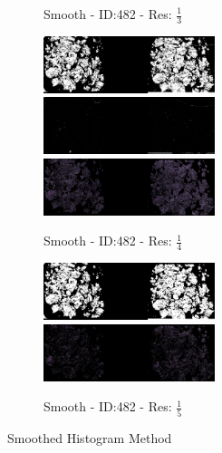 \documentclass[letterpaper,10pt,oneside]{article}
\begin{document}
\begin{figure}[hbtp]
\begin{subfigure}[b]{5cm}
    \caption{Smooth - ID:482 - Res: $\frac{1}{3}$}
  \end{subfigure}
  \begin{subfigure}[b]{5cm}
    \includegraphics[width=5cm]{visualization/results/smoothhistogram/res_reduce_4/Region_0_PO14-00482B3_1_2_201404171123.png}
    \includegraphics[width=5cm]{visualization/results/smoothhistogram/res_reduce_4/Region_1_PO14-00482B3_1_2_201404171123.png}
    \includegraphics[width=5cm]{visualization/results/smoothhistogram/res_reduce_4/Region_2_PO14-00482B3_1_2_201404171123.png}
    \caption{Smooth - ID:482 - Res: $\frac{1}{4}$}
  \end{subfigure}
  \begin{subfigure}[b]{5cm}
    \includegraphics[width=5cm]{visualization/results/smoothhistogram/res_reduce_5/Region_0_PO14-00482B3_1_2_201404171123.png}
    \includegraphics[width=5cm]{visualization/results/smoothhistogram/res_reduce_5/Region_1_PO14-00482B3_1_2_201404171123.png}
    \caption{Smooth - ID:482 - Res: $\frac{1}{5}$}
  \end{subfigure}
  \caption{Smoothed Histogram Method}
\end{figure}
\end{document}
